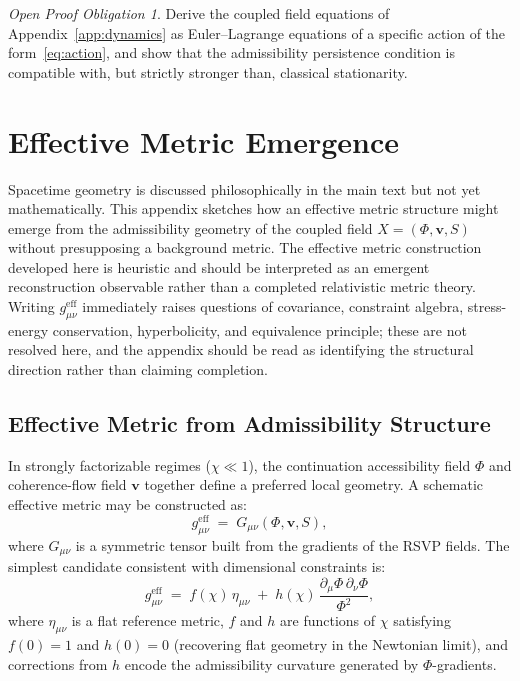 \documentclass[11pt, a4paper]{article}
\theoremstyle{plain}
\theoremstyle{definition}
\theoremstyle{remark}
\newtheorem{obligation}[theorem]{Open Proof Obligation}
\begin{document}
\begin{obligation}
\label{obl:variational}
Derive the coupled field equations of Appendix~\ref{app:dynamics} as Euler--Lagrange
equations of a specific action of the form~\eqref{eq:action}, and show that the
admissibility persistence condition is compatible with, but strictly stronger than,
classical stationarity.
\end{obligation}

\section{Effective Metric Emergence}
\label{app:metric}

Spacetime geometry is discussed philosophically in the main text but not yet
mathematically. This appendix sketches how an effective metric structure might emerge
from the admissibility geometry of the coupled field $X = (\Phi, \mathbf{v}, S)$
without presupposing a background metric. The effective metric construction developed
here is heuristic and should be interpreted as an emergent reconstruction observable
rather than a completed relativistic metric theory. Writing $g_{\mu\nu}^{\mathrm{eff}}$
immediately raises questions of covariance, constraint algebra, stress-energy
conservation, hyperbolicity, and equivalence principle; these are not resolved here,
and the appendix should be read as identifying the structural direction rather than
claiming completion.

\subsection{Effective Metric from Admissibility Structure}

In strongly factorizable regimes ($\chi \ll 1$), the continuation accessibility
field $\Phi$ and coherence-flow field $\mathbf{v}$ together define a preferred local
geometry. A schematic effective metric may be constructed as:
\begin{equation}
  \label{eq:effmetric}
  g_{\mu\nu}^{\mathrm{eff}} \;=\; G_{\mu\nu}(\Phi, \mathbf{v}, S),
\end{equation}
where $G_{\mu\nu}$ is a symmetric tensor built from the gradients of the RSVP fields.
The simplest candidate consistent with dimensional constraints is:
\[
  g_{\mu\nu}^{\mathrm{eff}} \;=\; f(\chi)\,\eta_{\mu\nu}
    \;+\; h(\chi)\,\frac{\partial_\mu\Phi\,\partial_\nu\Phi}{\Phi^2},
\]
where $\eta_{\mu\nu}$ is a flat reference metric, $f$ and $h$ are functions of
$\chi$ satisfying $f(0) = 1$ and $h(0) = 0$ (recovering flat geometry in the
Newtonian limit), and corrections from $h$ encode the admissibility curvature
generated by $\Phi$-gradients.
\end{document}

